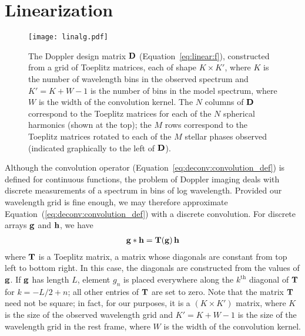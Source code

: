 \documentclass[modern]{aastex631}
\begin{document}
\section{Linearization}
\label{sec:linear}

\begin{figure}[ht!]
    \begin{centering}
        \texttt{[image: linalg.pdf]}
        \caption{%
            The Doppler design matrix ${\mathbf{D}}$ (Equation~\ref{eq:linear:f}), constructed from a grid of Toeplitz matrices, each of shape $K \times K'$, where $K$ is the number of wavelength bins in the observed spectrum and $K' = K + W - 1$ is the number of bins in the model spectrum, where $W$ is the width of the convolution kernel.
            The $N$ columns of ${\mathbf{D}}$ correspond to the Toeplitz matrices for each of the $N$ spherical harmonics (shown at the top);
            the $M$ rows correspond to the Toeplitz matrices rotated to each of the $M$ stellar phases observed (indicated graphically to the left of ${\mathbf{D}}$).
        }
        \label{fig:linalg}
    \end{centering}
\end{figure}

Although the convolution operator (Equation~\ref{eq:deconv:convolution_def})
is defined for continuous functions, the problem of Doppler imaging deals with discrete measurements of a spectrum in bins of log wavelength. 
Provided our wavelength grid is fine enough, we may therefore approximate Equation~(\ref{eq:deconv:convolution_def}) with a discrete convolution.
For discrete arrays ${\mathbf{g}}$ and ${\mathbf{h}}$, we have
%
\begin{align}
    \label{eq:linear:convolution_def}
    {\ensuremath{\mathbf{g}}} * {\mathbf{h}} = {\mathbf{T(g)}} \, {\mathbf{h}}
\end{align}
%
where ${\mathbf{T}}$ is a Toeplitz matrix, a matrix whose diagonals are constant from top left to bottom right. 
In this case, the diagonals are constructed from the values of ${\mathbf{g}}$. 
If ${\mathbf{g}}$ has length $L$, element $g_n$ is placed everywhere along the $k^\mathrm{th}$ diagonal of ${\mathbf{T}}$ for $k = -L / 2 + n$; all other entries of ${\mathbf{T}}$ are set to zero. 
Note that the matrix ${\mathbf{T}}$ need not be square; in fact, for our purposes, it is a $(K \times K')$ matrix, where $K$ is the size of the observed wavelength grid and $K' = K + W - 1$ is the size of the wavelength grid in the rest frame, where $W$ is the width of the convolution kernel.
\end{document}
